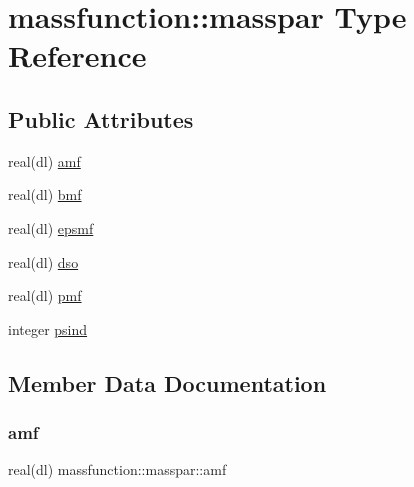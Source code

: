 \hypertarget{structmassfunction_1_1masspar}{}\section{massfunction\+:\+:masspar Type Reference}
\label{structmassfunction_1_1masspar}
\subsection*{Public Attributes}
\begin{DoxyCompactItemize}
\item 
real(dl) \mbox{\hyperlink{structmassfunction_1_1masspar_a3954c0f1dc597dcf036361b08cdf94ea}{amf}}
\item 
real(dl) \mbox{\hyperlink{structmassfunction_1_1masspar_a58c7a85ded07c37a033a11c39704449b}{bmf}}
\item 
real(dl) \mbox{\hyperlink{structmassfunction_1_1masspar_a9491b068f1f4779aa9885c940ca11044}{epsmf}}
\item 
real(dl) \mbox{\hyperlink{structmassfunction_1_1masspar_a8455b8b211fd449d23454e56d956b530}{dso}}
\item 
real(dl) \mbox{\hyperlink{structmassfunction_1_1masspar_a859d7dfa6b4480e237b2498d82c0977c}{pmf}}
\item 
integer \mbox{\hyperlink{structmassfunction_1_1masspar_a8762b8a865b05a4b713bcf8e0908ed7f}{psind}}
\end{DoxyCompactItemize}


\subsection{Member Data Documentation}
\mbox{\label{structmassfunction_1_1masspar_a3954c0f1dc597dcf036361b08cdf94ea}} 
\subsubsection{\texorpdfstring{amf}{amf}}
{\footnotesize\ttfamily real(dl) massfunction\+::masspar\+::amf}

\mbox{\label{structmassfunction_1_1masspar_a58c7a85ded07c37a033a11c39704449b}} 

